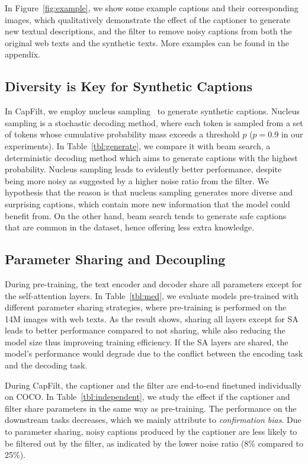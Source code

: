 In Figure~\ref{fig:example},
we show some example captions and their corresponding images, which qualitatively demonstrate the effect of the captioner to generate new textual descriptions, and the filter to remove noisy captions from both the original web texts and the synthetic texts. More examples can be found in the appendix.

\subsection{Diversity is Key for Synthetic Captions}

In CapFilt, we employ nucleus sampling~\cite{nucleus} to generate synthetic captions. Nucleus sampling is a stochastic decoding method, where each token is sampled from a set of tokens whose cumulative probability mass exceeds a threshold $p$ ($p=0.9$ in our experiments). In Table~\ref{tbl:generate},
we compare it with beam search, a deterministic decoding method which aims to generate captions with the highest probability. Nucleus sampling leads to evidently better performance, despite being more noisy as suggested by a higher noise ratio from the filter. We hypothesis that the reason is that nucleus sampling generates more diverse and surprising captions, which contain more new information that the model could benefit from. On the other hand, beam search tends to generate safe captions that are common in the dataset, hence offering less extra knowledge.

\subsection{Parameter Sharing and Decoupling}

During pre-training, the text encoder and decoder share all parameters except for the self-attention layers. In Table~\ref{tbl:med},
we evaluate models pre-trained with different parameter sharing strategies, where pre-training is performed on the 14M images with web texts. As the result shows, sharing all layers except for SA leads to better performance compared to not sharing, while also reducing the model size thus improveing training efficiency. If the SA layers are shared, the model's performance would degrade due to the conflict between the encoding task and the decoding task. 

During CapFilt, the captioner and the filter are end-to-end finetuned individually on COCO. In Table~\ref{tbl:independent},
we study the effect if the captioner and filter share parameters in the same way as pre-training. The performance on the downstream tasks decreases, which we mainly attribute to \textit{confirmation bias}. Due to parameter sharing, noisy captions produced by the captioner are less likely to be filtered out by the filter, as indicated by the lower noise ratio (8\% compared to 25\%).

